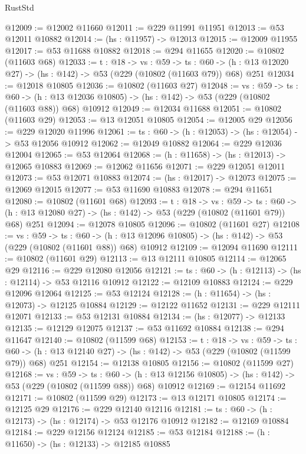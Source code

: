 \begin{lexlean}{RustStd}
\begin{coremodule}
@12009 := @12002 @11660
@12011 := @229 @11991 @11951
@12013 := @53 @12011 @10882
@12014 := (hs : @11957) -> @12013
@12015 := @12009 @11955
@12017 := @53 @11688 @10882
@12018 := @294 @11655
@12020 := @10802 (@11603 @68)
@12033 := {t : @18} ->
  {vs : @59} ->
  {ts : @60} -> (h : @13 @12020 @27) -> (hs : @142) -> @53 (@229 (@10802 (@11603 @79)) @68) @251
@12034 := @12018 @10805
@12036 := @10802 (@11603 @27)
@12048 := {vs : @59} ->
  {ts : @60} ->
  (h : @13 @12036 @10805) -> (hs : @142) -> @53 (@229 (@10802 (@11603 @88)) @68) @10912
@12049 := @12034 @11688
@12051 := @10802 (@11603 @29)
@12053 := @13 @12051 @10805
@12054 := @12005 @29
@12056 := @229 @12020 @11996
@12061 := {ts : @60} -> (h : @12053) -> (hs : @12054) -> @53 @12056 @10912
@12062 := @12049 @10882
@12064 := @229 @12036 @12004
@12065 := @53 @12064
@12068 := (h : @11658) -> (hs : @12013) -> @12065 @10883
@12069 := @12062 @11656
@12071 := @229 @12051 @12011
@12073 := @53 @12071 @10883
@12074 := (hs : @12017) -> @12073
@12075 := @12069 @12015
@12077 := @53 @11690 @10883
@12078 := @294 @11651
@12080 := @10802 (@11601 @68)
@12093 := {t : @18} ->
  {vs : @59} ->
  {ts : @60} -> (h : @13 @12080 @27) -> (hs : @142) -> @53 (@229 (@10802 (@11601 @79)) @68) @251
@12094 := @12078 @10805
@12096 := @10802 (@11601 @27)
@12108 := {vs : @59} ->
  {ts : @60} ->
  (h : @13 @12096 @10805) -> (hs : @142) -> @53 (@229 (@10802 (@11601 @88)) @68) @10912
@12109 := @12094 @11690
@12111 := @10802 (@11601 @29)
@12113 := @13 @12111 @10805
@12114 := @12065 @29
@12116 := @229 @12080 @12056
@12121 := {ts : @60} -> (h : @12113) -> (hs : @12114) -> @53 @12116 @10912
@12122 := @12109 @10883
@12124 := @229 @12096 @12064
@12125 := @53 @12124
@12128 := (h : @11654) -> (hs : @12073) -> @12125 @10884
@12129 := @12122 @11652
@12131 := @229 @12111 @12071
@12133 := @53 @12131 @10884
@12134 := (hs : @12077) -> @12133
@12135 := @12129 @12075
@12137 := @53 @11692 @10884
@12138 := @294 @11647
@12140 := @10802 (@11599 @68)
@12153 := {t : @18} ->
  {vs : @59} ->
  {ts : @60} -> (h : @13 @12140 @27) -> (hs : @142) -> @53 (@229 (@10802 (@11599 @79)) @68) @251
@12154 := @12138 @10805
@12156 := @10802 (@11599 @27)
@12168 := {vs : @59} ->
  {ts : @60} ->
  (h : @13 @12156 @10805) -> (hs : @142) -> @53 (@229 (@10802 (@11599 @88)) @68) @10912
@12169 := @12154 @11692
@12171 := @10802 (@11599 @29)
@12173 := @13 @12171 @10805
@12174 := @12125 @29
@12176 := @229 @12140 @12116
@12181 := {ts : @60} -> (h : @12173) -> (hs : @12174) -> @53 @12176 @10912
@12182 := @12169 @10884
@12184 := @229 @12156 @12124
@12185 := @53 @12184
@12188 := (h : @11650) -> (hs : @12133) -> @12185 @10885

\end{coremodule}
\end{lexlean}
